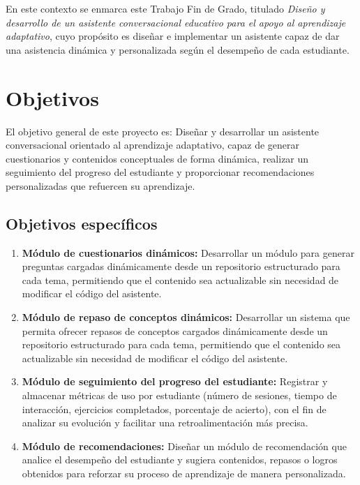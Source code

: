 \documentclass[a4paper,12pt,twoside,final]{book}
\begin{document}
En este contexto se enmarca este Trabajo Fin de Grado, titulado \textit{Diseño y desarrollo de un asistente conversacional educativo para el apoyo al aprendizaje adaptativo}, cuyo propósito es diseñar e implementar un asistente capaz de dar una asistencia dinámica y personalizada según el desempeño de cada estudiante.


\chapter{Objetivos}
\label{cap:objetivos}

El objetivo general de este proyecto es: Diseñar y desarrollar un asistente conversacional orientado al aprendizaje adaptativo, capaz de generar cuestionarios y contenidos conceptuales de forma dinámica, realizar un seguimiento del progreso del estudiante y proporcionar recomendaciones personalizadas que refuercen su aprendizaje.

\section{Objetivos específicos}
\label{sec:obj_especificos}

\begin{enumerate}
    \item \textbf{Módulo de cuestionarios dinámicos:} Desarrollar un módulo para generar preguntas cargadas dinámicamente desde un repositorio estructurado para cada tema, permitiendo que el contenido sea actualizable sin necesidad de modificar el código del asistente.
    \item \textbf{Módulo de repaso de conceptos dinámicos:} Desarrollar un sistema que permita ofrecer repasos de conceptos cargados dinámicamente desde un repositorio estructurado para cada tema, permitiendo que el contenido sea actualizable sin necesidad de modificar el código del asistente.
    \item \textbf{Módulo de seguimiento del progreso del estudiante:} Registrar y almacenar métricas de uso por estudiante (número de sesiones, tiempo de interacción, ejercicios completados, porcentaje de acierto), con el fin de analizar su evolución y facilitar una retroalimentación más precisa.
    \item \textbf{Módulo de recomendaciones:} Diseñar un módulo de recomendación que analice el desempeño del estudiante y sugiera contenidos, repasos o logros obtenidos para reforzar su proceso de aprendizaje de manera personalizada.
\end{enumerate}
\end{document}
